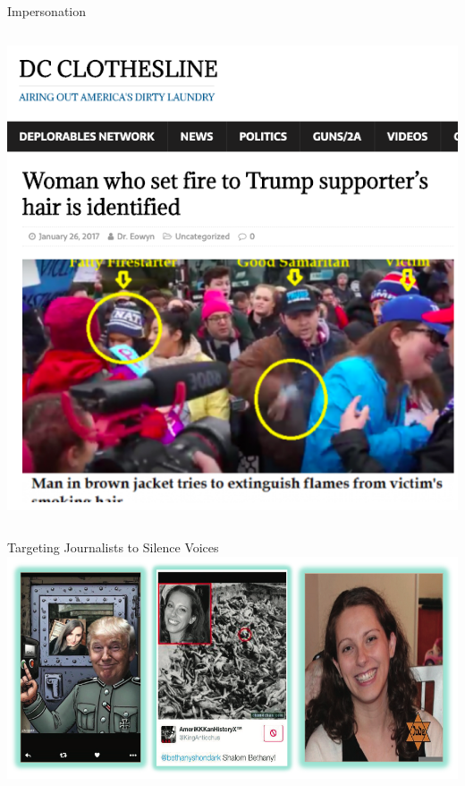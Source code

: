 \documentclass[nobackground,dvipsnames,table,aspectratio=169]{beamer}
\begin{document}
\begin{frame}{Impersonation}
\begin{columns}
            \includegraphics[width=\textwidth]{hair-on-fire-article}
    \end{columns}
\end{frame}

\begin{frame}{Targeting Journalists to Silence Voices}
    \includegraphics[width=\textwidth]{targeting-journalists}
\end{frame}
\end{document}
